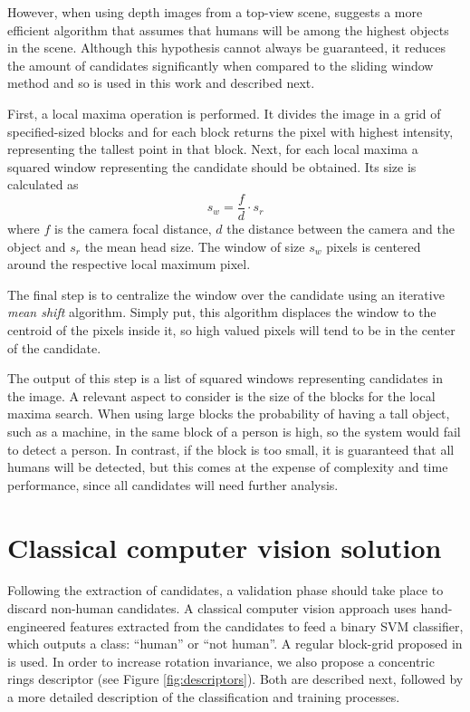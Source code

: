     However, when using depth images from a top-view scene, \cite{rauter} suggests a more efficient algorithm that assumes that humans will be among the highest objects in the scene. Although this hypothesis cannot always be guaranteed, it reduces the amount of candidates significantly when compared to the sliding window method and so is used in this work and described next.

    First, a local maxima operation is performed. It divides the image in a grid of specified-sized blocks and for each block returns the pixel with highest intensity, representing the tallest point in that block. Next, for each local maxima a squared window representing the candidate should be obtained. Its size is calculated as
    \begin{equation}
      s_w = \frac{f}{d} \cdot s_r
    \end{equation}
    where $f$ is the camera focal distance, $d$ the distance between the camera and the object and $s_r$ the mean head size. The window of size $s_w$ pixels is centered around the respective local maximum pixel.

    The final step is to centralize the window over the candidate using an iterative \textit{mean shift} \cite{meanshift} algorithm. Simply put, this algorithm displaces the window to the centroid of the pixels inside it, so high valued pixels will tend to be in the center of the candidate.

    The output of this step is a list of squared windows representing candidates in the image. A relevant aspect to consider is the size of the blocks for the local maxima search. When using large blocks the probability of having a tall object, such as a machine, in the same block of a person is high, so the system would fail to detect a person. In contrast, if the block is too small, it is guaranteed that all humans will be detected, but this comes at the expense of complexity and time performance, since all candidates will need further analysis.

\section{Classical computer vision solution}
\label{sec:classical}

    Following the extraction of candidates, a validation phase should take place to discard non-human candidates. A classical computer vision approach \cite{rauter} uses hand-engineered features extracted from the candidates to feed a binary SVM classifier, which outputs a class: ``human'' or ``not human''. A regular block-grid proposed in \cite{rauter} is used. In order to increase rotation invariance, we also propose a concentric rings descriptor (see Figure \ref{fig:descriptors}). Both are described next, followed by a more detailed description of the classification and training processes.

